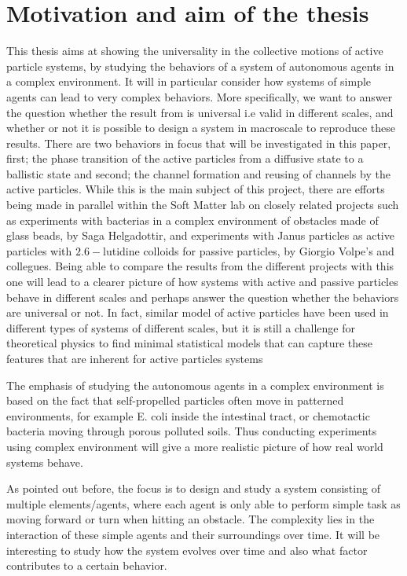 \section{Motivation and aim of the thesis}

This thesis aims at showing the universality in the collective motions of active particle systems, 
by studying the behaviors of a system of autonomous agents in a complex environment. 
It will in particular consider how systems of simple agents can lead to very complex behaviors. 
More specifically, we want to answer the question whether the result from \cite{nilsson2017metastable} is 
universal i.e valid in different scales, and whether or not it is possible to design a system in 
macroscale to reproduce these results. There are two behaviors in focus that will be investigated 
in this paper, first; the phase transition of the active particles from a diffusive state to a ballistic state and 
second; the channel formation and reusing of channels by the active particles. While this is the main subject of 
this project, there are efforts being made in parallel within the Soft Matter lab on closely related projects such as 
experiments with bacterias in a complex environment of obstacles made of glass beads, by Saga Helgadottir, and 
experiments with Janus particles as active particles with $\num{2.6}-$lutidine colloids for passive particles, by 
Giorgio Volpe's and collegues. Being able to compare the results from the different projects with this one 
will lead to a clearer picture of how systems with active and passive particles behave in different 
scales and perhaps answer the question whether the behaviors are universal or not. In fact, similar model 
of active particles have been used in different types of systems of different scales, but it is still a challenge 
for theoretical physics to find minimal statistical models that can capture these features that are inherent 
for active particles systems\cite{toner2005hydrodynamics, li2008minimal, bertin2009hydrodynamic}

The emphasis of studying the autonomous agents in a complex environment is based on the 
fact that self-propelled particles often move in patterned environments, for example E. coli 
inside the intestinal tract\cite{berg2008coli}, or chemotactic bacteria moving through porous 
polluted soils\cite{ford2007role}. Thus conducting experiments using complex environment 
will give a more realistic picture of how real world systems behave.
 
As pointed out before, the focus is to design and study a system consisting of multiple elements/agents, where 
each agent is only able to perform simple task as moving forward or turn when hitting an obstacle. The 
complexity lies in the interaction of these simple agents and their surroundings over time. It will be 
interesting to study how the system evolves over time and also what factor contributes to a certain behavior. 
